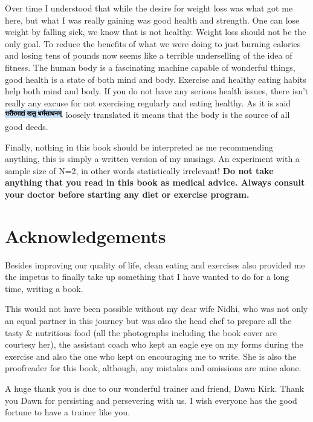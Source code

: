 \documentclass[
  oneside]{book}
\begin{document}
Over time I understood that while the desire for weight loss was what got me here, but what I was really gaining was good health and strength. One can lose weight by falling sick, we know that is not healthy. Weight loss should not be the only goal. To reduce the benefits of what we were doing to just burning calories and losing tens of pounds now seems like a terrible underselling of the idea of fitness. The human body is a fascinating machine capable of wonderful things, good health is a state of both mind and body. Exercise and healthy eating habits help both mind and body. If you do not have any serious health issues, there isn't really any excuse for not exercising regularly and eating healthy. As it is said \includegraphics{pictures/sanskrit1.png} loosely translated it means that the body is the source of all good deeds.

Finally, nothing in this book should be interpreted as me recommending anything, this is simply a written version of my musings. An experiment with a sample size of N=2, in other words statistically irrelevant! \textbf{Do not take anything that you read in this book as medical advice. Always consult your doctor before starting any diet or exercise program.}

\hypertarget{acknowledgements}{%
\section{Acknowledgements}\label{acknowledgements}}

Besides improving our quality of life, clean eating and exercises also provided me the impetus to finally take up something that I have wanted to do for a long time, writing a book.

This would not have been possible without my dear wife Nidhi, who was not only an equal partner in this journey but was also the head chef to prepare all the tasty \& nutritious food (all the photographs including the book cover are courtesy her), the assistant coach who kept an eagle eye on my forms during the exercise and also the one who kept on encouraging me to write. She is also the proofreader for this book, although, any mistakes and omissions are mine alone.

A huge thank you is due to our wonderful trainer and friend, Dawn Kirk. Thank you Dawn for persisting and persevering with us. I wish everyone has the good fortune to have a trainer like you.
\end{document}
